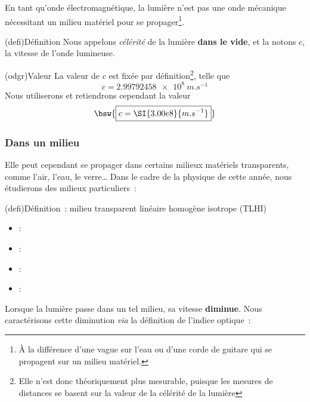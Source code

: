 \documentclass[../../main/main.tex]{subfiles}
\begin{document}
En tant qu'onde électromagnétique, la lumière n'est pas une onde mécanique
nécessitant un milieu matériel pour se propager\footnote{À la différence d'une
	vague sur l'eau ou d'une corde de guitare qui se propagent sur un milieu
	matériel.}.
\begin{tcb}(defi){Définition}
	Nous appelons \textit{célérité} de la lumière \textbf{dans le vide}, et
	la notons $c$, la vitesse de l'onde lumineuse.
\end{tcb}
\begin{tcb}[sidebyside](odgr){Valeur}
	La valeur de $c$ est fixée par définition\footnote{Elle n'est donc
		théoriquement plus mesurable, puisque les mesures de distances se basent sur
		la valeur de la célérité de la lumière}, telle que
	\[c = \SI{2.99792458e8}{m.s^{-1}}\]
	\tcblower
	Nous utiliserons et retiendrons cependant la valeur
	\[
		\bsw{
			\boxed{c = \SI{3.00e8}{m.s^{-1}}}
		}
	\]
\end{tcb}

\subsubsection{Dans un milieu}

Elle peut cependant se propager dans certains milieux matériels transparents,
comme l'air, l'eau, le verre… Dans le cadre de la physique de cette année, nous
étudierons des milieux particuliers~:

\begin{tcb}(defi){Définition~: milieu transparent linéaire homogène isotrope (TLHI)}
	\begin{itemize}[leftmargin=66pt]
		\item[\textbf{Transparent}] : 
		\item[\textbf{Linéaire}] : 
		\item[\textbf{Homogène}] : 
		\item[\textbf{Isotrope}] : 
	\end{itemize}
\end{tcb}

Lorsque la lumière passe dans un tel milieu, sa vitesse \textbf{diminue}. Nous
caractérisons cette diminution \textit{via} la définition de l'indice optique~:
\end{document}

